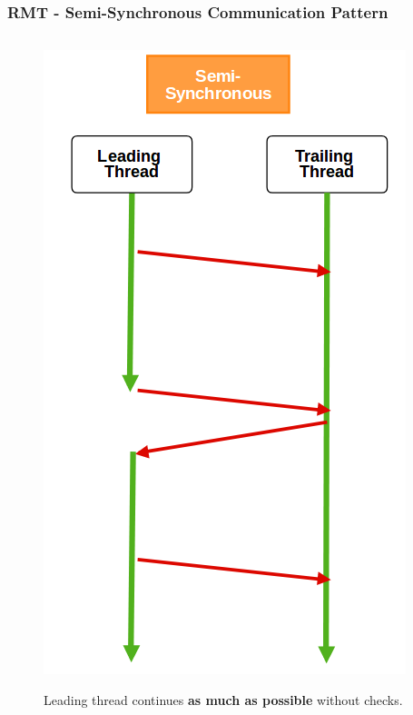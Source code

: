 \documentclass[xcolor=pdftex,dvipsnames,table]{beamer}
\begin{document}
\begin{frame}
	\frametitle{RMT - Semi-Synchronous Communication Pattern}  
    
	\begin{columns}[c]
		\column{2in}
         	\begin{figure}[H]
            	\captionsetup{labelformat=empty,labelsep=none}
         		\begin{center} \includegraphics[scale=0.27]{Pattern-SemiSync.png} \end{center}
                Leading thread continues \textbf{as much as possible} without checks. 
     		\end{figure}
            

\end{columns}
\end{frame}
\end{document}
